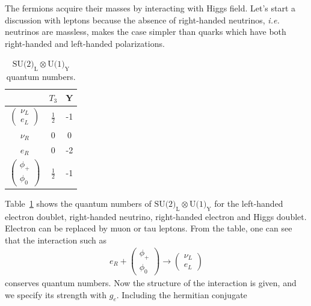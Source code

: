 The fermions acquire their masses by interacting with Higgs field. 
Let's start a discussion with leptons because the absence of right-handed neutrinos, 
\textit{i.e.} neutrinos are massless, makes the case simpler than quarks which 
have both right-handed and left-handed polarizations. 
\begin{table}[htb] 
\centering
\vspace{0.5cm} 
\caption{$\textrm{SU(2)}_\textrm{L} \otimes \textrm{U(1)}_\textrm{Y}$ quantum numbers.}
\vspace{0.5cm} 
\begin{tabular}{c c c}
\hline 
      & $T_3$ & Y \\
\hline \hline 
$\left(  \begin{array}{c} \nu_L \\ e_L \end{array} \right)$      & $\displaystyle  \frac{1}{2} $ & -1 \\
$ \nu_{R}$                                                      & 0 & 0 \\
$ e_R$                                                           & 0 & -2 \\
$\left(  \begin{array}{c} \phi_+  \\ \phi_0 \end{array} \right)$      & $\displaystyle  \frac{1}{2} $ & -1 \\
\hline 
\end{tabular}
\label{tab:su2Qnum}
\end{table}
Table~\ref{tab:su2Qnum} shows the quantum numbers of  
$\textrm{SU(2)}_\textrm{L} \otimes \textrm{U(1)}_\textrm{Y}$
for the left-handed electron doublet, right-handed neutrino, right-handed electron and 
Higgs doublet. Electron can be replaced by muon or tau leptons. 
From the table, one can see that the interaction such as 
\begin{eqnarray} 
e_R + \left(  \begin{array}{c} \phi_+  \\ \phi_0 \end{array} \right) 
\rightarrow 
\left(  \begin{array}{c} \nu_L \\ e_L \end{array} \right)
\end{eqnarray} 
conserves quantum numbers. Now the structure of the interaction is given, and
we specify its strength with $g_e$. Including the hermitian conjugate 
